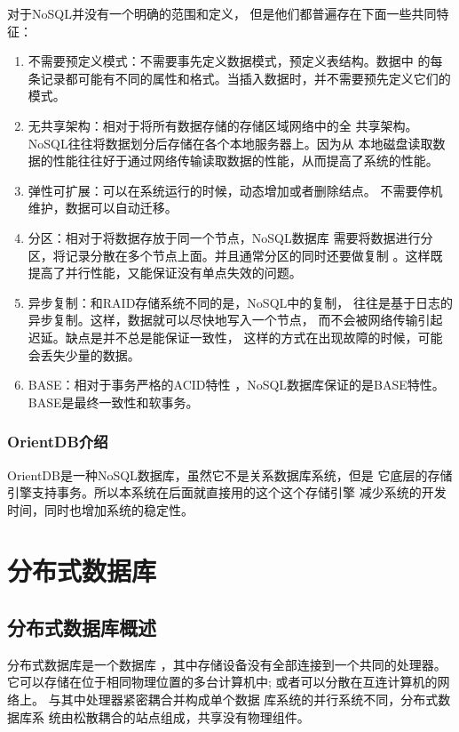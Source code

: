 对于NoSQL并没有一个明确的范围和定义，
但是他们都普遍存在下面一些共同特征：
\begin{enumerate}
	\item   不需要预定义模式：不需要事先定义数据模式，预定义表结构。数据中
	的每条记录都可能有不同的属性和格式。当插入数据时，并不需要预先定义它们的模式。
\item 	无共享架构：相对于将所有数据存储的存储区域网络中的全
共享架构。NoSQL往往将数据划分后存储在各个本地服务器上。因为从
本地磁盘读取数据的性能往往好于通过网络传输读取数据的性能，从而提高了系统的性能。
\item 	弹性可扩展：可以在系统运行的时候，动态增加或者删除结点。
不需要停机维护，数据可以自动迁移。
\item 	分区：相对于将数据存放于同一个节点，NoSQL数据库
需要将数据进行分区，将记录分散在多个节点上面。并且通常分区的同时还要做复制
。这样既提高了并行性能，又能保证没有单点失效的问题。
\item 	异步复制：和RAID存储系统不同的是，NoSQL中的复制，
往往是基于日志的异步复制。这样，数据就可以尽快地写入一个节点，
而不会被网络传输引起迟延。缺点是并不总是能保证一致性，
这样的方式在出现故障的时候，可能会丢失少量的数据。
\item 	BASE：相对于事务严格的ACID特性
	，NoSQL数据库保证的是BASE特性。BASE是最终一致性和软事务。
\end{enumerate}
\subsubsection{OrientDB介绍}
OrientDB是一种NoSQL数据库，虽然它不是关系数据库系统，但是
它底层的存储引擎支持事务。所以本系统在后面就直接用的这个这个存储引擎
减少系统的开发时间，同时也增加系统的稳定性。
\section{分布式数据库}
\subsection{分布式数据库概述}
分布式数据库是一个数据库
，其中存储设备没有全部连接到一个共同的处理器。
它可以存储在位于相同物理位置的多台计算机中; 
或者可以分散在互连计算机的网络上。
与其中处理器紧密耦合并构成单个数据
库系统的并行系统不同，分布式数据库系
统由松散耦合的站点组成，共享没有物理组件。
